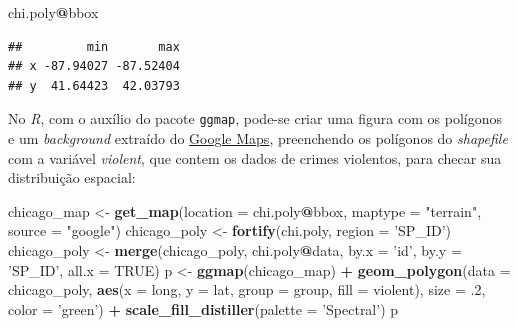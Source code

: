 \documentclass[12pt,]{article}
\newenvironment{Shaded}{\begin{snugshade}}{\end{snugshade}}
\newcommand{\KeywordTok}[1]{\textcolor[rgb]{0.13,0.29,0.53}{\textbf{#1}}}
\newcommand{\DataTypeTok}[1]{\textcolor[rgb]{0.13,0.29,0.53}{#1}}
\newcommand{\DecValTok}[1]{\textcolor[rgb]{0.00,0.00,0.81}{#1}}
\newcommand{\StringTok}[1]{\textcolor[rgb]{0.31,0.60,0.02}{#1}}
\newcommand{\OtherTok}[1]{\textcolor[rgb]{0.56,0.35,0.01}{#1}}
\newcommand{\OperatorTok}[1]{\textcolor[rgb]{0.81,0.36,0.00}{\textbf{#1}}}
\newcommand{\NormalTok}[1]{#1}
\begin{document}
\begin{Shaded}
\begin{Highlighting}[]
\NormalTok{chi.poly}\OperatorTok{@}\NormalTok{bbox}
\end{Highlighting}
\end{Shaded}

\begin{verbatim}
##         min       max
## x -87.94027 -87.52404
## y  41.64423  42.03793
\end{verbatim}

No \emph{R}, com o auxílio do pacote \texttt{ggmap}, pode-se criar uma
figura com os polígonos e um \emph{background} extraído do
\href{https://www.google.com.br/maps}{Google Maps}, preenchendo os
polígonos do \emph{shapefile} com a variável \emph{violent}, que contem
os dados de crimes violentos, para checar sua distribuição espacial:

\begin{Shaded}
\begin{Highlighting}[]
\NormalTok{chicago_map <-}\StringTok{ }\KeywordTok{get_map}\NormalTok{(}\DataTypeTok{location =}\NormalTok{ chi.poly}\OperatorTok{@}\NormalTok{bbox, }\DataTypeTok{maptype =} \StringTok{"terrain"}\NormalTok{,}
                       \DataTypeTok{source =} \StringTok{"google"}\NormalTok{)}
\NormalTok{chicago_poly <-}\StringTok{ }\KeywordTok{fortify}\NormalTok{(chi.poly, }\DataTypeTok{region =} \StringTok{'SP_ID'}\NormalTok{)}
\NormalTok{chicago_poly <-}\StringTok{ }\KeywordTok{merge}\NormalTok{(chicago_poly, chi.poly}\OperatorTok{@}\NormalTok{data, }\DataTypeTok{by.x =} \StringTok{'id'}\NormalTok{,}
                      \DataTypeTok{by.y =} \StringTok{'SP_ID'}\NormalTok{, }\DataTypeTok{all.x =} \OtherTok{TRUE}\NormalTok{)}
\NormalTok{p <-}\StringTok{ }\KeywordTok{ggmap}\NormalTok{(chicago_map) }\OperatorTok{+}\StringTok{ }\KeywordTok{geom_polygon}\NormalTok{(}\DataTypeTok{data =}\NormalTok{ chicago_poly,}
                                       \KeywordTok{aes}\NormalTok{(}\DataTypeTok{x =}\NormalTok{ long, }\DataTypeTok{y =}\NormalTok{ lat, }
                                           \DataTypeTok{group =}\NormalTok{ group, }\DataTypeTok{fill =}\NormalTok{ violent),}
                                       \DataTypeTok{size =}\NormalTok{ .}\DecValTok{2}\NormalTok{, }\DataTypeTok{color =} \StringTok{'green'}\NormalTok{) }\OperatorTok{+}\StringTok{ }
\StringTok{      }\KeywordTok{scale_fill_distiller}\NormalTok{(}\DataTypeTok{palette =} \StringTok{'Spectral'}\NormalTok{)}
\NormalTok{p}
\end{Highlighting}
\end{Shaded}
\end{document}
